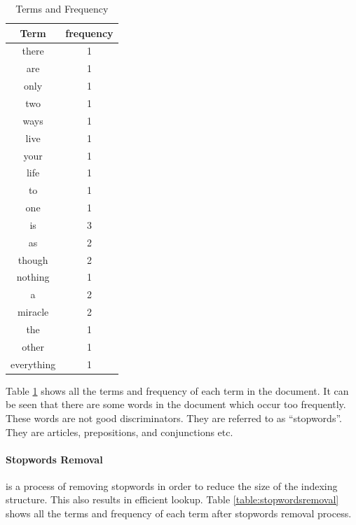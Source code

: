 % 
\begin{table}
\centering
\begin{tabular}{|c|c|}

\hline \textbf{Term} & \textbf{frequency} \\
\hline there & 1 \\
\hline are & 1 \\
\hline only & 1 \\ 
\hline two & 1 \\
\hline ways & 1 \\
\hline live & 1 \\
\hline your & 1 \\
\hline life & 1 \\
\hline to & 1 \\
\hline one & 1 \\
\hline is & 3 \\
\hline as & 2 \\
\hline though & 2 \\
\hline nothing & 1 \\
\hline a & 2 \\
\hline miracle & 2 \\
\hline the & 1 \\
\hline other & 1 \\
\hline everything & 1 \\  
\hline
\end{tabular}
\caption{Terms and Frequency} \label{table:termsandfrequency}
\end{table}

Table \ref{table:termsandfrequency} shows all the terms and frequency of each term in the document. It can be seen that there are some words in the 
document which occur too frequently. These words are not good discriminators. They are referred to as ``stopwords''. They are
articles, prepositions, and conjunctions etc.
\paragraph{Stopwords Removal}
is a process of removing stopwords in order to reduce the size of the indexing structure. This also results in efficient lookup.
Table \ref{table:stopwordsremoval} shows all the terms and frequency of each term after stopwords removal process.

